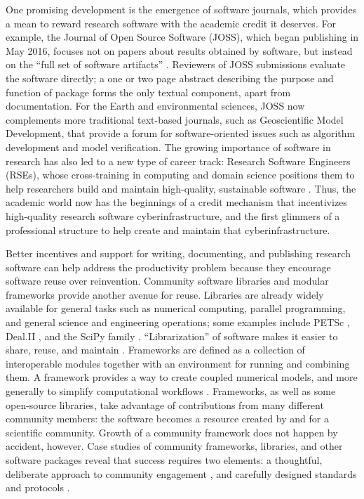 \documentclass[journal abbreviation, manuscript]{copernicus}
\begin{document}
One promising development is the emergence of software journals, which provides a mean to reward research software with the academic credit it deserves. For example, the Journal of Open Source Software (JOSS), which began publishing in May 2016, focuses not on papers about results obtained by software, but instead on the ``full set of software artifacts'' \citep{smith2018journal}. Reviewers of JOSS submissions evaluate the software directly; a one or two page abstract describing the purpose and function of package forms the only textual component, apart from documentation. For the Earth and environmental sciences, JOSS now complements more traditional text-based journals, such as Geoscientific Model Development, that provide a forum for software-oriented issues such as algorithm development and model verification. The growing importance of software in research has also led to a new type of career track: Research Software Engineers (RSEs), whose cross-training in computing and domain science positions them to help researchers build and maintain high-quality, sustainable software \citep{baxter2012research}. Thus, the academic world now has the beginnings of a credit mechanism that incentivizes high-quality research software cyberinfrastructure, and the first glimmers of a professional structure to help create and maintain that cyberinfrastructure. 

Better incentives and support for writing, documenting, and publishing research software can help address the productivity problem because they encourage software reuse over reinvention. Community software libraries and modular frameworks provide another avenue for reuse. Libraries are already widely available for general tasks such as numerical computing, parallel programming, and general science and engineering operations; some examples include PETSc \citep{abhyankar2018petsc}, Deal.II \citep{bangerth2007deal}, and the SciPy family \citep{2020SciPy-NMeth}. ``Librarization'' of software makes it easier to share, reuse, and maintain \citep{brown2014run}. Frameworks are defined as a collection of interoperable modules together with an environment for running and combining them. A framework provides a way to create coupled numerical models, and more generally to simplify computational workflows \citep[e.g.,][]{leavesley1996modular,voinov2004modular,peckham2013component}. Frameworks, as well as some open-source libraries, take advantage of contributions from many different community members: the software becomes a resource created by and for a scientific community. Growth of a community framework does not happen by accident, however. Case studies of community frameworks, libraries, and other software packages reveal that success requires two elements: a thoughtful, deliberate approach to community engagement \citep{bangerth2013makes,turk2013scaling,lawrence2015science}, and carefully designed standards and protocols \citep{peckham2013component,harpham2019introductory}.
\end{document}

